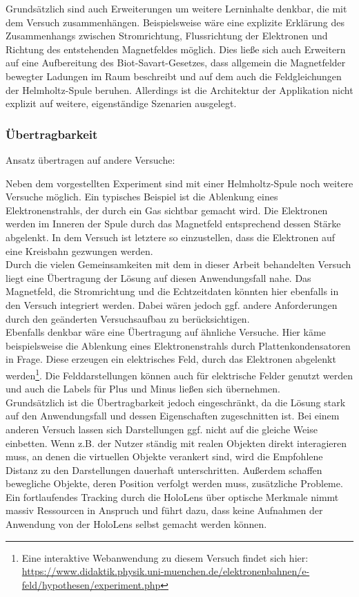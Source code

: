 Grundsätzlich sind auch Erweiterungen um weitere Lerninhalte denkbar, die mit dem Versuch zusammenhängen. Beispielsweise wäre eine explizite Erklärung des Zusammenhangs zwischen Stromrichtung, Flussrichtung der Elektronen und Richtung des entstehenden Magnetfeldes möglich. Dies ließe sich auch Erweitern auf eine Aufbereitung des Biot-Savart-Gesetzes, dass allgemein die Magnetfelder bewegter Ladungen im Raum beschreibt und auf dem auch die Feldgleichungen der Helmholtz-Spule beruhen. Allerdings ist die Architektur der Applikation nicht explizit auf weitere, eigenständige Szenarien ausgelegt.\\

\subsubsection{Übertragbarkeit}
Ansatz übertragen auf andere Versuche:

Neben dem vorgestellten Experiment sind mit einer Helmholtz-Spule noch weitere Versuche möglich. Ein typisches Beispiel ist die Ablenkung eines Elektronenstrahls, der durch ein Gas sichtbar gemacht wird. Die Elektronen werden im Inneren der Spule durch das Magnetfeld entsprechend dessen Stärke abgelenkt. In dem Versuch ist letztere so einzustellen, dass die Elektronen auf eine Kreisbahn gezwungen werden.\\

Durch die vielen Gemeinsamkeiten mit dem in dieser Arbeit behandelten Versuch liegt eine Übertragung der Lösung auf diesen Anwendungsfall nahe. Das Magnetfeld, die Stromrichtung und die Echtzeitdaten könnten hier ebenfalls in den Versuch integriert werden. Dabei wären jedoch ggf. andere Anforderungen durch den geänderten Versuchsaufbau zu berücksichtigen.\\

Ebenfalls denkbar wäre eine Übertragung auf ähnliche Versuche. Hier käme beispielsweise die Ablenkung eines Elektronenstrahls durch Plattenkondensatoren in Frage. Diese erzeugen ein elektrisches Feld, durch das Elektronen abgelenkt werden\footnote{Eine interaktive Webanwendung zu diesem Versuch findet sich hier: \url{https://www.didaktik.physik.uni-muenchen.de/elektronenbahnen/e-feld/hypothesen/experiment.php}}. Die Felddarstellungen können auch für elektrische Felder genutzt werden und auch die Labels für Plus und Minus ließen sich übernehmen.\\

Grundsätzlich ist die Übertragbarkeit jedoch eingeschränkt, da die Lösung stark auf den Anwendungsfall und dessen Eigenschaften zugeschnitten ist. Bei einem anderen Versuch lassen sich Darstellungen ggf. nicht auf die gleiche Weise einbetten. Wenn z.B. der Nutzer ständig mit realen Objekten direkt interagieren muss, an denen die virtuellen Objekte verankert sind, wird die Empfohlene Distanz zu den Darstellungen dauerhaft unterschritten. Außerdem schaffen bewegliche Objekte, deren Position verfolgt werden muss, zusätzliche Probleme. Ein fortlaufendes Tracking durch die HoloLens über optische Merkmale nimmt massiv Ressourcen in Anspruch und führt dazu, dass keine Aufnahmen der Anwendung von der HoloLens selbst gemacht werden können.\\

